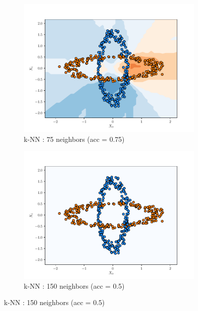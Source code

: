 \begin{figure}[H]
\begin{subfigure}{0.495\textwidth}
        \includegraphics[width=\textwidth]{resources/pdf/make_data1_knn_75.pdf}
        \caption{k-NN : 75 neighbors (acc = \num{0.75})}
    \end{subfigure}
    \begin{subfigure}{0.495\textwidth}
        \includegraphics[width=\textwidth]{resources/pdf/make_data1_knn_150.pdf}
        \caption{k-NN : 150 neighbors (acc = \num{0.5})}
    \end{subfigure}
    \label{fig:knn_make_data1}
\end{figure}
